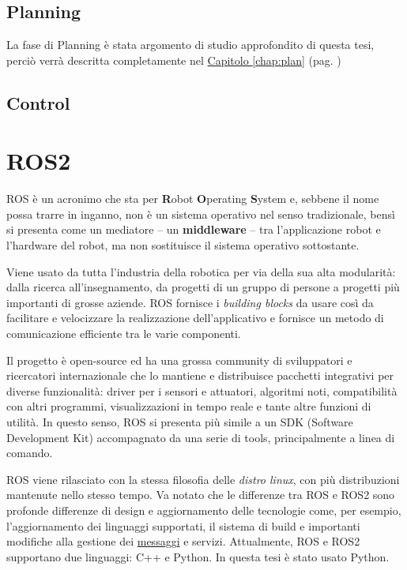 \subsection{Planning}
La fase di Planning è stata argomento di studio approfondito di questa tesi, perciò verrà descritta
completamente nel \hyperref[chap:plan]{Capitolo \ref{chap:plan}} (pag. \pageref{chap:plan})

\subsection{Control}

\section{ROS2}
\label{sec:ros}
ROS è un acronimo che sta per \textbf{R}obot \textbf{O}perating \textbf{S}ystem e,
sebbene il nome possa trarre in inganno, non è un sistema operativo nel senso tradizionale,
bensì si presenta come un mediatore -- un \textbf{middleware} -- tra l'applicazione robot
e l'hardware del robot, ma non sostituisce il sistema operativo sottostante.

Viene usato da tutta l'industria della robotica per via della sua alta modularità:
dalla ricerca all'insegnamento, da progetti di un gruppo di persone a progetti più importanti
di grosse aziende. ROS fornisce i \textit{building blocks} da usare così da facilitare e velocizzare
la realizzazione dell'applicativo e fornisce un metodo di comunicazione efficiente tra le varie componenti.

Il progetto è open-source ed ha una grossa community di sviluppatori e ricercatori internazionale
che lo mantiene e distribuisce pacchetti integrativi per diverse funzionalità: driver per i sensori
e attuatori, algoritmi noti, compatibilità con altri programmi, visualizzazioni in tempo reale
e tante altre funzioni di utilità. In questo senso, ROS si presenta più simile a un SDK 
(Software Development Kit) accompagnato da una serie di tools, principalmente a linea di comando.

ROS viene rilasciato con la stessa filosofia delle \textit{distro linux}, con più distribuzioni
mantenute nello stesso tempo. Va notato che le differenze tra ROS e ROS2 sono profonde differenze di
design e aggiornamento delle tecnologie come, per esempio, l'aggiornamento dei linguaggi supportati,
il sistema di build e importanti modifiche alla gestione dei \hyperref[ros:msgs]{messaggi} e servizi.
Attualmente, ROS e ROS2 supportano due linguaggi: C++ e Python. In questa tesi è stato usato Python.

